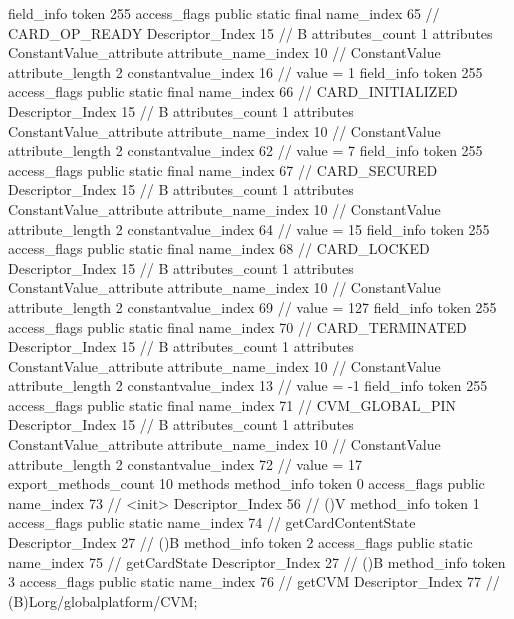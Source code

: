 {{{{{{{				}
				}
			}
			field_info {
				token	255
				access_flags	public static final
				name_index	65		// CARD_OP_READY
				Descriptor_Index	15		// B
				attributes_count	1
				attributes {
				ConstantValue_attribute {
					attribute_name_index	10		// ConstantValue
					attribute_length	2
					constantvalue_index	16		// value = 1
				}
				}
			}
			field_info {
				token	255
				access_flags	public static final
				name_index	66		// CARD_INITIALIZED
				Descriptor_Index	15		// B
				attributes_count	1
				attributes {
				ConstantValue_attribute {
					attribute_name_index	10		// ConstantValue
					attribute_length	2
					constantvalue_index	62		// value = 7
				}
				}
			}
			field_info {
				token	255
				access_flags	public static final
				name_index	67		// CARD_SECURED
				Descriptor_Index	15		// B
				attributes_count	1
				attributes {
				ConstantValue_attribute {
					attribute_name_index	10		// ConstantValue
					attribute_length	2
					constantvalue_index	64		// value = 15
				}
				}
			}
			field_info {
				token	255
				access_flags	public static final
				name_index	68		// CARD_LOCKED
				Descriptor_Index	15		// B
				attributes_count	1
				attributes {
				ConstantValue_attribute {
					attribute_name_index	10		// ConstantValue
					attribute_length	2
					constantvalue_index	69		// value = 127
				}
				}
			}
			field_info {
				token	255
				access_flags	public static final
				name_index	70		// CARD_TERMINATED
				Descriptor_Index	15		// B
				attributes_count	1
				attributes {
				ConstantValue_attribute {
					attribute_name_index	10		// ConstantValue
					attribute_length	2
					constantvalue_index	13		// value = -1
				}
				}
			}
			field_info {
				token	255
				access_flags	public static final
				name_index	71		// CVM_GLOBAL_PIN
				Descriptor_Index	15		// B
				attributes_count	1
				attributes {
				ConstantValue_attribute {
					attribute_name_index	10		// ConstantValue
					attribute_length	2
					constantvalue_index	72		// value = 17
				}
				}
			}
			}
			export_methods_count	10
			methods {
				method_info {
					token	0
					access_flags	public
					name_index	73		// <init>
					Descriptor_Index	56		// ()V
				}
				method_info {
					token	1
					access_flags	public static
					name_index	74		// getCardContentState
					Descriptor_Index	27		// ()B
				}
				method_info {
					token	2
					access_flags	public static
					name_index	75		// getCardState
					Descriptor_Index	27		// ()B
				}
				method_info {
					token	3
					access_flags	public static
					name_index	76		// getCVM
					Descriptor_Index	77		// (B)Lorg/globalplatform/CVM;
}}}}}

